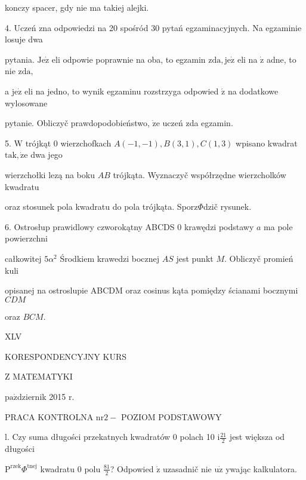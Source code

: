 \documentclass[a4paper,12pt]{article}
\begin{document}
konczy spacer, gdy nie ma takiej alejki.

4. Uczeń zna odpowiedzi na 20 spośród 30 pytań egzaminacyjnych. Na egzaminie losuje dwa

pytania. $\mathrm{J}\mathrm{e}\dot{\mathrm{z}}$ eli odpowie poprawnie na oba, to egzamin $\mathrm{z}\mathrm{d}\mathrm{a}, \mathrm{j}\mathrm{e}\dot{\mathrm{z}}$ eli na $\dot{\mathrm{z}}$ adne, to nie $\mathrm{z}\mathrm{d}\mathrm{a},$

a $\mathrm{j}\mathrm{e}\dot{\mathrm{z}}$ eli na jedno, to wynik egzaminu rozstrzyga odpowied $\acute{\mathrm{z}}$ na dodatkowe wylosowane

pytanie. Obliczyč prawdopodobieństwo, $\dot{\mathrm{z}}\mathrm{e}$ uczeń zda egzamin.

5. $\mathrm{W}$ trójkąt $0$ wierzchofkach $A(-1,-1), B(3,1), C(1,3)$ wpisano kwadrat $\mathrm{t}\mathrm{a}\mathrm{k}, \dot{\mathrm{z}}\mathrm{e}$ dwa jego

wierzchołki lezą na boku $AB$ trójkąta. Wyznaczyč współrzędne wierzcholków kwadratu

oraz stosunek pola kwadratu do pola trójkąta. Sporz$\Phi$dzič rysunek.

6. Ostrosłup prawidlowy czworokątny ABCDS $0$ krawędzi podstawy $a$ ma pole powierzchni

całkowitej $5\alpha^{2}$ Środkiem krawedzi bocznej $AS$ jest punkt $M$. Obliczyč promień kuli

opisanej na ostroslupie ABCDM oraz cosinus kąta pomiędzy ścianami bocznymi $CDM$

oraz $BCM.$







XLV

KORESPONDENCYJNY KURS

Z MATEMATYKI

$\mathrm{p}\mathrm{a}\acute{\mathrm{z}}$dziernik 2015 $\mathrm{r}.$

PRACA KONTROLNA $\mathrm{n}\mathrm{r} 2-$ POZIOM PODSTAWOWY

l. Czy suma długości przekatnych kwadratów $0$ polach 10 $\mathrm{i} \displaystyle \frac{21}{2}$ jest większa od długości

$\mathrm{P}^{\mathrm{r}\mathrm{z}\mathrm{e}\mathrm{k}}\Phi^{\mathrm{t}\mathrm{n}\mathrm{e}\mathrm{j}}$ kwadratu $0$ polu $\displaystyle \frac{81}{2}$? Odpowied $\acute{\mathrm{z}}$ uzasadnič nie $\mathrm{u}\dot{\mathrm{z}}$ ywając kalkulatora.
\end{document}
